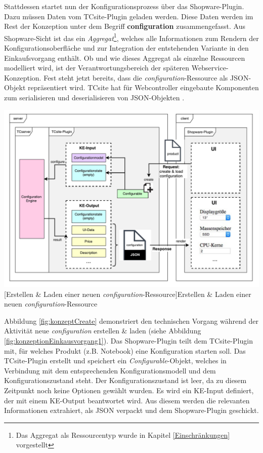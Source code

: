\documentclass[11pt, a4paper, titlepage, listof=totoc, bibliography=totoc, index=totoc, twoside, openright, headings=normal]{scrreprt}
\begin{document}
Stattdessen startet nun der Konfigurationsprozess über das Shopware-Plugin. Dazu müssen Daten vom TCsite-Plugin geladen werden. Diese Daten werden im Rest der Konzeption unter dem Begriff \textbf{configuration} zusammengefasst. Aus Shopware-Sicht ist das ein \emph{Aggregat}\footnote{Das Aggregat als Ressourcentyp wurde in Kapitel \ref{Einschränkungen} vorgestellt}, welches alle Informationen zum Rendern der Konfigurationsoberfläche und zur Integration der entstehenden Variante in den Einkaufsvorgang enthält. Ob und wie dieses Aggregat als einzelne Ressourcen modelliert wird, ist der Verantwortungsbereich der späteren Webservice-Konzeption. Fest steht jetzt bereits, dass die \emph{configuration}-Ressource als JSON-Objekt repräsentiert wird. TCsite hat für Webcontroller eingebaute Komponenten zum serialisieren und deserialisieren von JSON-Objekten \citep{tactonTCsiteDevelopmentManual}.

\vspace{1em}
\begin{minipage}{\linewidth}
	\centering
	\includegraphics[width=1\linewidth]{Abbildungen/konzeptCreate.pdf}
	[Erstellen \& Laden einer neuen \emph{configuration}-Ressource]{Erstellen \& Laden einer neuen \emph{configuration}-Ressource}
	\label{fig:konzeptCreate}
\end{minipage}
\vspace{0.3em}

Abbildung \ref{fig:konzeptCreate} demonstriert den technischen Vorgang während der Aktivität \glqq neue \emph{configuration} erstellen \& laden\grqq{} (siehe Abbildung \ref{fig:konzeptionEinkausvorgang1}). Das Shopware-Plugin teilt dem TCsite-Plugin mit, für welches Produkt (z.B. Notebook) eine Konfiguration starten soll. Das TCsite-Plugin erstellt und speichert ein \emph{Configurable}-Objekt, welches in Verbindung mit dem entsprechenden Konfigurationsmodell und dem Konfigurationszustand steht. Der Konfigurationszustand ist leer, da zu diesem Zeitpunkt noch keine Optionen gewählt wurden. Es wird ein KE-Input definiert, der mit einem KE-Output beantwortet wird. Aus diesem werden die relevanten Informationen extrahiert, als JSON verpackt und dem Shopware-Plugin geschickt.
\end{document}
